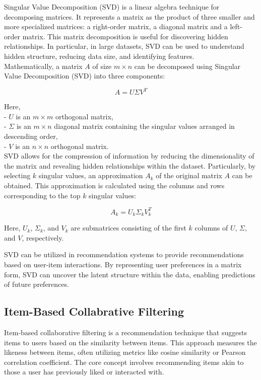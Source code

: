 \documentclass[conference]{IEEEtran}
\begin{document}
	Singular Value Decomposition (SVD) is a linear algebra technique for decomposing matrices. It represents a matrix as the product of three smaller and more specialized matrices: a right-order matrix, a diagonal matrix and a left-order matrix. This matrix decomposition is useful for discovering hidden relationships. In particular, in large datasets, SVD can be used to understand hidden structure, reducing data size, and identifying features. \\
	Mathematically, a matrix $A$ of size $m \times n$ can be decomposed using Singular Value Decomposition (SVD) into three components:
	
	\[ A = U \Sigma V^T \]
	
	Here, \\
	- $U$ is an $m \times m$ orthogonal matrix, \\
	- $\Sigma$ is an $m \times n$ diagonal matrix containing the singular values arranged in descending order, \\
	- $V$ is an $n \times n$ orthogonal matrix.\\
	
	SVD allows for the compression of information by reducing the dimensionality of the matrix and revealing hidden relationships within the dataset. Particularly, by selecting $k$ singular values, an approximation $A_k$ of the original matrix $A$ can be obtained. This approximation is calculated using the columns and rows corresponding to the top $k$ singular values:
	
	\[ A_k = U_k \Sigma_k V_k^T \]
	
	Here, $U_k$, $\Sigma_k$, and $V_k$ are submatrices consisting of the first $k$ columns of $U$, $\Sigma$, and $V$, respectively.
	
	SVD can be utilized in recommendation systems to provide recommendations based on user-item interactions. By representing user preferences in a matrix form, SVD can uncover the latent structure within the data, enabling predictions of future preferences.
	
	\subsection{Item-Based Collabrative Filtering}
	
	Item-based collaborative filtering is a recommendation technique that suggests items to users based on the similarity between items. This approach measures the likeness between items, often utilizing metrics like cosine similarity or Pearson correlation coefficient. The core concept involves recommending items akin to those a user has previously liked or interacted with.
	
\end{document}
